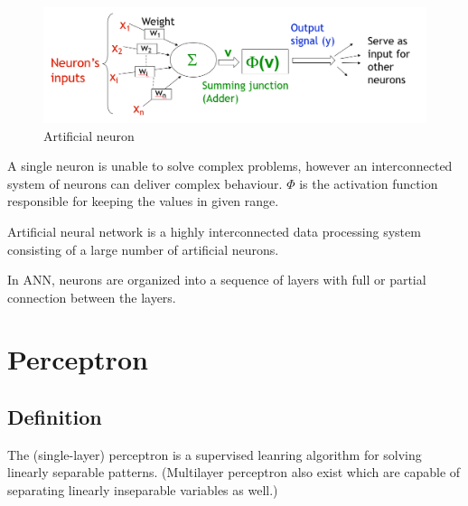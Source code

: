 \documentclass[a4paper,12pt,answers]{article}
\begin{document}
	\begin{figure}[H]
		\centering
		\includegraphics[width=0.7\linewidth]{artifical_neuron}
		\caption{Artificial neuron}
		\label{fig:artificalneuron}
	\end{figure}
	
	A single neuron is unable to solve complex problems, however an interconnected system of neurons can deliver complex behaviour. $\Phi$ is the activation function responsible for keeping the values in given range.
	
	Artificial neural network is a highly interconnected data processing system consisting of a large number of artificial neurons.
	
	In ANN, neurons are organized into a sequence of layers with full or partial connection between the layers. 
	
	
	
	\newpage
	\section{Perceptron}
	\subsection{Definition}
	The (single-layer) perceptron is a supervised leanring algorithm for solving linearly separable patterns. (Multilayer perceptron also exist which are capable of separating linearly inseparable variables as well.)
	
\end{document}

